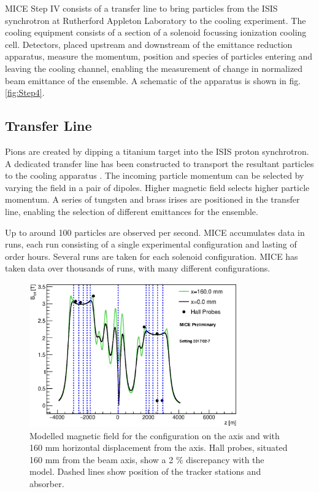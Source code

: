 MICE Step IV  \cite{mice} \cite{mice_step_iv} consists of a transfer line to 
bring particles from the ISIS synchrotron at Rutherford Appleton Laboratory to 
the cooling experiment.  The cooling equipment consists of a section of a 
solenoid focussing ionization cooling cell. Detectors, placed upstream and 
downstream of the emittance reduction apparatus, measure the momentum, position 
and species of particles entering and leaving the cooling channel, enabling the 
measurement of change in normalized beam emittance of the ensemble.
A schematic of the apparatus is shown in fig.\,\ref{fig:Step4}.

\subsection{Transfer Line}
Pions are created by dipping a titanium target into the ISIS proton synchrotron. 
A dedicated transfer line has been constructed to transport the resultant 
particles to the cooling apparatus \cite{beamline} \cite{pion_contamination} 
\cite{characterization}.  The incoming particle momentum can be selected by 
varying the field in a pair of dipoles. Higher magnetic field selects higher 
particle momentum. A series of tungsten and brass irises are positioned in the 
transfer line, enabling the selection of different emittances for the ensemble.

Up to around 100 particles are observed per second. MICE accumulates data in 
runs, each run consisting of a single experimental configuration and lasting of 
order hours. Several runs are taken for each solenoid configuration.  MICE has 
taken data over thousands of runs, with many different configurations.

\begin{figure}[!tbh]
    \centering
    \includegraphics*[width=0.8\textwidth]{01-Introduction/Figures/bfield_vs_z.eps}
    \caption{Modelled magnetic field for the configuration on the axis and with 
    160 mm horizontal displacement from the axis. Hall probes, situated 160 mm from 
    the beam axis, show a 2 $\%$ discrepancy with the model. Dashed lines show 
    position of the tracker stations and absorber. \label{fig:field}}
\end{figure}

